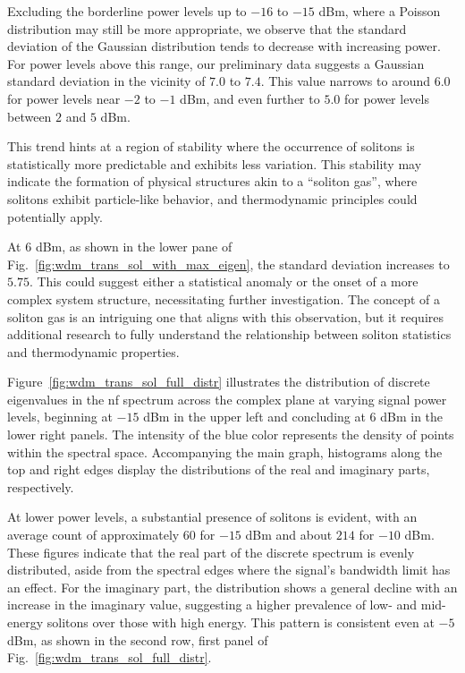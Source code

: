 Excluding the borderline power levels up to \(-16\) to \(-15\) dBm, where a Poisson distribution may still be more appropriate, we observe that the standard deviation of the Gaussian distribution tends to decrease with increasing power. For power levels above this range, our preliminary data suggests a Gaussian standard deviation in the vicinity of \(7.0\) to \(7.4\). This value narrows to around \(6.0\) for power levels near \(-2\) to \(-1\) dBm, and even further to \(5.0\) for power levels between \(2\) and \(5\) dBm.

This trend hints at a region of stability where the occurrence of solitons is statistically more predictable and exhibits less variation. This stability may indicate the formation of physical structures akin to a ``soliton gas'', where solitons exhibit particle-like behavior, and thermodynamic principles could potentially apply.

At \(6\) dBm, as shown in the lower pane of Fig.~\ref{fig:wdm_trans_sol_with_max_eigen}, the standard deviation increases to \(5.75\). This could suggest either a statistical anomaly or the onset of a more complex system structure, necessitating further investigation. The concept of a soliton gas is an intriguing one that aligns with this observation, but it requires additional research to fully understand the relationship between soliton statistics and thermodynamic properties.






Figure~\ref{fig:wdm_trans_sol_full_distr} illustrates the distribution of discrete eigenvalues in the \acrshort{nf} spectrum across the complex plane at varying signal power levels, beginning at \(-15\) dBm in the upper left and concluding at \(6\) dBm in the lower right panels. The intensity of the blue color represents the density of points within the spectral space. Accompanying the main graph, histograms along the top and right edges display the distributions of the real and imaginary parts, respectively.

At lower power levels, a substantial presence of solitons is evident, with an average count of approximately \(60\) for \(-15\) dBm and about \(214\) for \(-10\) dBm. These figures indicate that the real part of the discrete spectrum is evenly distributed, aside from the spectral edges where the signal's bandwidth limit has an effect. For the imaginary part, the distribution shows a general decline with an increase in the imaginary value, suggesting a higher prevalence of low- and mid-energy solitons over those with high energy. This pattern is consistent even at \(-5\) dBm, as shown in the second row, first panel of Fig.~\ref{fig:wdm_trans_sol_full_distr}.

